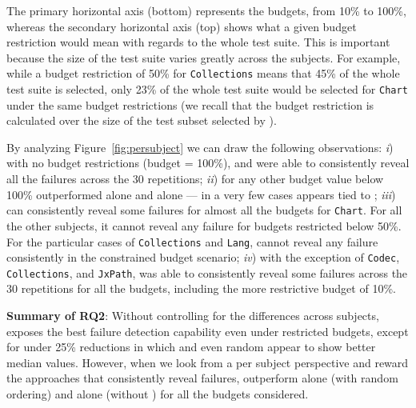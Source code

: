 The primary horizontal axis (bottom) represents the budgets, from 10\% to 100\%,
whereas the secondary horizontal axis (top) shows what a given budget restriction would mean with regards to the whole test suite.
This is important because the size of the test suite varies greatly across the subjects.
For example, while a budget restriction of 50\% for \texttt{Collections} means that 45\% of the whole test suite is selected, 
only 23\% of the whole test suite would be selected for \texttt{Chart} under the same budget restrictions
(we recall that the budget restriction is calculated over the size of the test subset selected by \ek).


By analyzing Figure~\ref{fig:persubject} we can draw the following observations:
\textit{i}) with no budget restrictions (budget = 100\%), \ekr and \fz were able to consistently reveal all the failures across the 30 repetitions;
\textit{ii}) for any other budget value below 100\% \fz outperformed \ek alone and \fs alone --- in a very few cases \fs appears tied to \fz;
\textit{iii}) \ekr can consistently reveal some failures for almost all the budgets for \texttt{Chart}. 
For all the other subjects, it cannot reveal any failure for budgets restricted below 50\%.
For the particular cases of \texttt{Collections} and \texttt{Lang}, \ekr cannot reveal any failure consistently in the constrained budget scenario;
\textit{iv}) with the exception of \texttt{Codec}, \texttt{Collections}, and \texttt{JxPath}, 
\fz was able to consistently reveal some failures across the 30 repetitions for all the budgets, including the more restrictive budget of 10\%.

\begin{tcolorbox}%
\textbf{Summary of RQ2}: 
Without controlling for the differences across subjects, 
\fz exposes the best failure detection capability even under restricted budgets, 
except for under 25\% reductions in which \ekr and even random appear to show better median values.
However, when we look from a per subject perspective and reward the approaches that consistently reveal failures,
\fz outperform \ek alone (with random ordering) and \fs alone (without \tcs) for all the budgets considered.
\end{tcolorbox}



